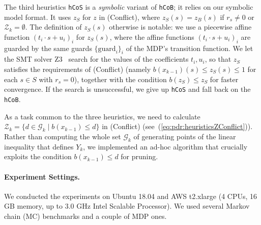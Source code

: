 The third heuristics \verb|hCoS| is a \emph{symbolic} variant of \verb|hCoB|; it relies on our symbolic model format. It uses $z_{S}$ for $z$ in (Conflict), where $z_{S}(s)=z_{B}(s)$ if $r_{s}\neq 0$ or $\mathcal{Z}_k=\emptyset$. The definition of $z_{S}(s)$ otherwise is notable: we use a piecewise affine function $(t_{i}\cdot s + u_{i})_{i}$ for $z_{S}(s)$, where the affine functions $(t_{i}\cdot s + u_{i})_{i}$ are guarded by the same guards $\{\text{guard}_i\}_{i}$ of the MDP's transition function. We let the SMT solver Z3~\cite{MB08} search for the values of the coefficients $t_{i}, u_{i}$, so that $z_{S}$ satisfies the requirements of (Conflict) (namely $b(x_{k-1})(s) \leq z_{S}(s) \leq 1$ for each $s\in S$ with $r_s=0$), together with the condition $b (z_{S}) \leq z_{S}$ for faster convergence. If the search is unsuccessful, we give up \verb|hCoS| and fall back on the \verb|hCoB|.

As a task common to the three heuristics, we need to calculate $\mathcal{Z}_k = \{d \in \mathcal{G}_k \mid b(x_{k-1}) \leq d\}$ in (Conflict) (see~(\ref{eq:pdr:heuristicsZConflict})). Rather than computing the whole set $\mathcal{G}_k$ of generating points of the linear inequality that defines $Y_{k}$, we implemented an ad-hoc algorithm that crucially exploits the condition $b(x_{k-1}) \leq d$ for pruning.

\paragraph{Experiment Settings.}
We conducted the experiments on Ubuntu 18.04 and AWS t2.xlarge (4 CPUs, 16 GB memory, up to 3.0 GHz Intel Scalable Processor). We used several Markov chain (MC) benchmarks and a couple of MDP ones.

